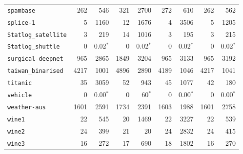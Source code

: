 \begin{tabular}{lrrrrrrrr}
\texttt{spambase} & 262 & 546 & 321 & 2700 & 272 & 610 & 262 & 562\\
\texttt{splice-1} & 5 & 1160 & 12 & 1676 & 4 & 3506 & 5 & 1205\\
\texttt{Statlog\_satellite} & 3 & 219 & 14 & 1016 & 3 & 195 & 3 & 215\\
\texttt{Statlog\_shuttle} & 0 & 0.02$^*$ & 0 & 0.02$^*$ & 0 & 0.02$^*$ & 0 & 0.02$^*$\\
\texttt{surgical-deepnet} & 965 & 2865 & 1849 & 3204 & 965 & 3133 & 965 & 3192\\
\texttt{taiwan\_binarised} & 4217 & 1001 & 4896 & 2890 & 4189 & 1046 & 4217 & 1041\\
\texttt{titanic} & 35 & 3059 & 52 & 943 & 45 & 1077 & 42 & 180\\
\texttt{vehicle} & 0 & 0.00$^*$ & 0 & 60$^*$ & 0 & 0.00$^*$ & 0 & 0.00$^*$\\
\texttt{weather-aus} & 1601 & 2591 & 1734 & 2391 & 1603 & 1988 & 1601 & 2758\\
\texttt{wine1} & 22 & 545 & 20 & 1469 & 22 & 3227 & 22 & 539\\
\texttt{wine2} & 24 & 399 & 21 & 20 & 24 & 2832 & 24 & 415\\
\texttt{wine3} & 16 & 272 & 17 & 690 & 18 & 1802 & 16 & 270\\
\bottomrule
\end{tabular}
